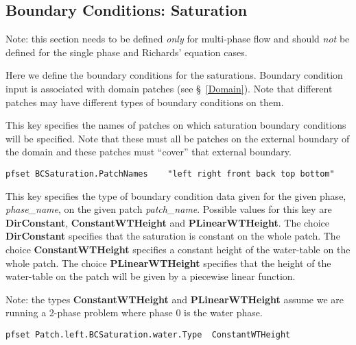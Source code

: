 
\subsection{Boundary Conditions: Saturation}
\label{Boundary Conditions: Saturation}

Note: this section needs to be defined {\em only} for multi-phase flow
and should {\em not} be defined for the single phase and Richards'
equation cases.

Here we define the boundary conditions for the saturations.  Boundary
condition input is associated with domain patches (see \S~\ref{Domain}).
Note that different patches may have different types of boundary
conditions on them.

{
This key specifies the names of patches on which saturation boundary
conditions will be specified.  Note that these must all be patches on
the external boundary of the domain and these patches must ``cover''
that external boundary.
}
\begin{display}\begin{verbatim}
pfset BCSaturation.PatchNames    "left right front back top bottom"
\end{verbatim}\end{display}

{
This key specifies the type of boundary condition data given for the
given phase, {\em phase\_name}, on the given patch {\em patch\_name}.
Possible values for this key are {\bf DirConstant},
{\bf ConstantWTHeight} and {\bf PLinearWTHeight}.  The choice
{\bf DirConstant} specifies that the saturation is constant on the whole
patch.  The choice {\bf ConstantWTHeight} specifies a constant height of
the water-table on the whole patch.  The choice {\bf PLinearWTHeight}
specifies that the height of the water-table on the patch will be given
by a piecewise linear function.

Note: the types {\bf ConstantWTHeight} and {\bf PLinearWTHeight} assume
we are running a 2-phase problem where phase 0 is the water phase.
}
\begin{display}\begin{verbatim}
pfset Patch.left.BCSaturation.water.Type  ConstantWTHeight
\end{verbatim}\end{display}

